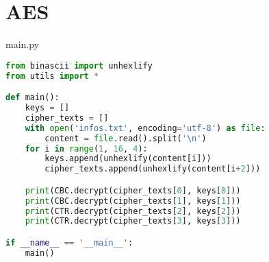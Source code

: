 \section{AES}
\label{appendix:aes}
main.py
\begin{lstlisting}[language = Python]
from binascii import unhexlify
from utils import *

def main():
    keys = []
    cipher_texts = []
    with open('infos.txt', encoding='utf-8') as file:
        content = file.read().split('\n')
    for i in range(1, 16, 4):
        keys.append(unhexlify(content[i]))
        cipher_texts.append(unhexlify(content[i+2]))

    print(CBC.decrypt(cipher_texts[0], keys[0]))
    print(CBC.decrypt(cipher_texts[1], keys[1]))
    print(CTR.decrypt(cipher_texts[2], keys[2]))
    print(CTR.decrypt(cipher_texts[3], keys[3]))

if __name__ == '__main__':
    main()
\end{lstlisting}

